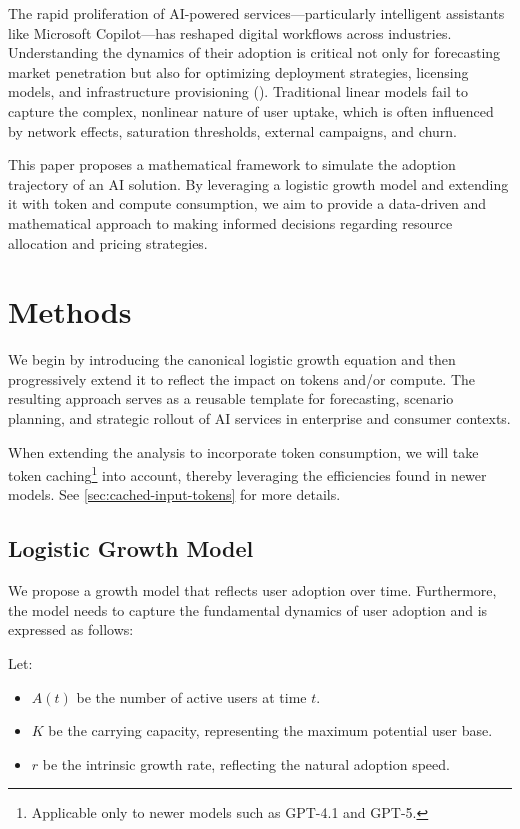 \documentclass[10pt,twocolumn]{article}
\begin{document}
The rapid proliferation of AI-powered services—particularly intelligent assistants like Microsoft Copilot—has reshaped digital workflows across industries. Understanding the dynamics of their adoption is critical not only for forecasting market penetration but also for optimizing deployment strategies, licensing models, and infrastructure provisioning (\cite{Soh2024}). Traditional linear models fail to capture the complex, nonlinear nature of user uptake, which is often influenced by network effects, saturation thresholds, external campaigns, and churn.

This paper proposes a mathematical framework to simulate the adoption trajectory of an AI solution. By leveraging a logistic growth model and extending it with token and compute consumption, we aim to provide a data-driven and mathematical approach to making informed decisions regarding resource allocation and pricing strategies.
\section{Methods}

We begin by introducing the canonical logistic growth equation and then progressively extend it to reflect the impact on tokens and/or compute. The resulting approach serves as a reusable template for forecasting, scenario planning, and strategic rollout of AI services in enterprise and consumer contexts.

When extending the analysis to incorporate token consumption, we will take token caching\footnote{Applicable only to newer models such as GPT-4.1 and GPT-5.} into account, thereby leveraging the efficiencies found in newer models. See \autoref{sec:cached-input-tokens} for more details.
\subsection{Logistic Growth Model}
We propose a growth model that reflects user adoption over time. Furthermore, the model needs to capture the fundamental dynamics of user adoption and is expressed as follows:

Let:
\begin{itemize}
\item $A(t)$ be the number of active users at time $t$.
\item $K$ be the carrying capacity, representing the maximum potential user base.
\item $r$ be the intrinsic growth rate, reflecting the natural adoption speed.
\end{itemize}
\end{document}
